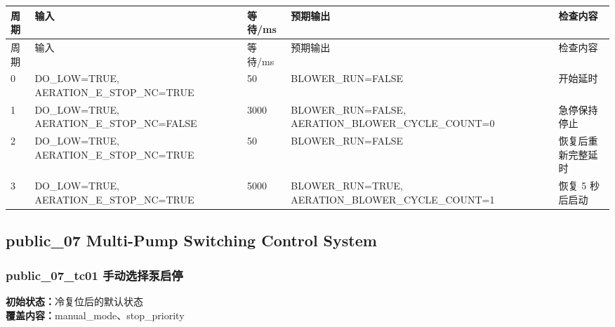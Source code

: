 \begin{longtable}{L{1.0cm}L{4.7cm}L{1.4cm}L{4.0cm}L{2.1cm}}

\toprule

周期 & 输入 & 等待/ms & 预期输出 & 检查内容\\

\midrule

\endfirsthead

\toprule

周期 & 输入 & 等待/ms & 预期输出 & 检查内容\\

\midrule

\endhead

0 & DO\_LOW=TRUE, AERATION\_E\_STOP\_NC=TRUE & 50 & BLOWER\_RUN=FALSE & 开始延时\\

1 & DO\_LOW=TRUE, AERATION\_E\_STOP\_NC=FALSE & 3000 & BLOWER\_RUN=FALSE, AERATION\_BLOWER\_CYCLE\_COUNT=0 & 急停保持停止\\

2 & DO\_LOW=TRUE, AERATION\_E\_STOP\_NC=TRUE & 50 & BLOWER\_RUN=FALSE & 恢复后重新完整延时\\

3 & DO\_LOW=TRUE, AERATION\_E\_STOP\_NC=TRUE & 5000 & BLOWER\_RUN=TRUE, AERATION\_BLOWER\_CYCLE\_COUNT=1 & 恢复 5 秒后启动\\

\bottomrule

\end{longtable}

\subsection{{\ttfamily public\_07} Multi-Pump Switching Control System}

\subsubsection{{\ttfamily public\_07\_tc01} 手动选择泵启停}

\noindent\textbf{初始状态：}冷复位后的默认状态\\

\textbf{覆盖内容：}manual\_mode、stop\_priority

